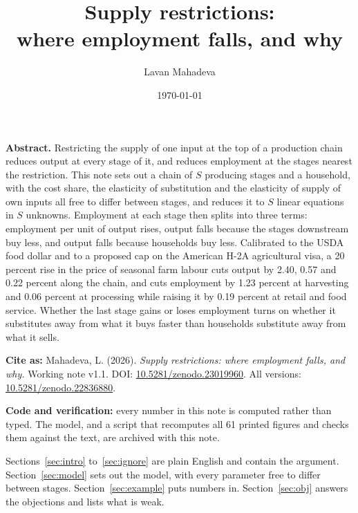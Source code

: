 \documentclass[11pt,a4paper]{article}
\title{\textbf{Supply restrictions:\\where employment falls, and why}}
\author{Lavan Mahadeva}
\date{\today}
\begin{document}
\maketitle
\thispagestyle{fancy}

\begin{center}
\begin{minipage}{0.92\textwidth}
\small
\textbf{Abstract.} Restricting the supply of one input at the top of a production chain reduces output at every stage of it, and reduces employment at the stages nearest the restriction. This note sets out a chain of $S$ producing stages and a household, with the cost share, the elasticity of substitution and the elasticity of supply of own inputs all free to differ between stages, and reduces it to $S$ linear equations in $S$ unknowns. Employment at each stage then splits into three terms: employment per unit of output rises, output falls because the stages downstream buy less, and output falls because households buy less. Calibrated to the USDA food dollar and to a proposed cap on the American H-2A agricultural visa, a 20 percent rise in the price of seasonal farm labour cuts output by 2.40, 0.57 and 0.22 percent along the chain, and cuts employment by 1.23 percent at harvesting and 0.06 percent at processing while raising it by 0.19 percent at retail and food service. Whether the last stage gains or loses employment turns on whether it substitutes away from what it buys faster than households substitute away from what it sells.
\end{minipage}
\end{center}

\medskip

\begin{center}
\begin{minipage}{0.92\textwidth}
\footnotesize
\textbf{Cite as:} Mahadeva, L. (2026). \emph{Supply restrictions: where employment falls, and why.} Working note v1.1. DOI: \href{https://doi.org/10.5281/zenodo.23019960}{10.5281/zenodo.23019960}. All versions: \href{https://doi.org/10.5281/zenodo.22836880}{10.5281/zenodo.22836880}.

\textbf{Code and verification:} every number in this note is computed rather than typed. The model, and a script that recomputes all 61 printed figures and checks them against the text, are archived with this note.
\end{minipage}
\end{center}

\bigskip

Sections~\ref{sec:intro} to~\ref{sec:ignore} are plain English and contain the argument. Section~\ref{sec:model} sets out the model, with every parameter free to differ between stages. Section~\ref{sec:example} puts numbers in. Section~\ref{sec:obj} answers the objections and lists what is weak.
\end{document}
